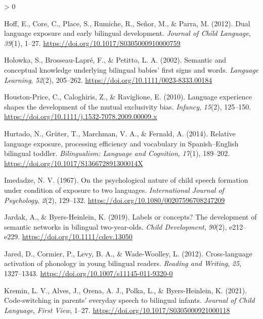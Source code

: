 \documentclass[
  english,
  ,man,floatsintext]{apa6}
\newlength{\cslhangindent}
\newenvironment{CSLReferences}[2] %
 {%
  \setlength{\parindent}{0pt}
  \ifodd #1 \everypar{\setlength{\hangindent}{\cslhangindent}}\ignorespaces\fi
  \ifnum #2 > 0
  \setlength{\parskip}{#2\baselineskip}
  \fi
 }%
 {}
\begin{document}
\begin{CSLReferences}{1}{0}
\leavevmode\hypertarget{ref-Hoff_etal_2012}{}%
Hoff, E., Core, C., Place, S., Rumiche, R., Señor, M., \& Parra, M. (2012). Dual language exposure and early bilingual development. \emph{Journal of Child Language}, \emph{39}(1), 1--27. \url{https://doi.org/10.1017/S0305000910000759}

\leavevmode\hypertarget{ref-Holowka_etal_2002}{}%
Holowka, S., Brosseau-Lapré, F., \& Petitto, L. A. (2002). Semantic and conceptual knowledge underlying bilingual babies' first signs and words. \emph{Language Learning}, \emph{52}(2), 205--262. \url{https://doi.org/10.1111/0023-8333.00184}

\leavevmode\hypertarget{ref-Houston-Price_etal_2010}{}%
Houston-Price, C., Caloghiris, Z., \& Raviglione, E. (2010). Language experience shapes the development of the mutual exclusivity bias. \emph{Infancy}, \emph{15}(2), 125--150. \url{https://doi.org/10.1111/j.1532-7078.2009.00009.x}

\leavevmode\hypertarget{ref-Hurtado_etal_2014}{}%
Hurtado, N., Grüter, T., Marchman, V. A., \& Fernald, A. (2014). Relative language exposure, processing efficiency and vocabulary in {S}panish--{E}nglish bilingual toddler. \emph{Bilingualism: Language and Cognition}, \emph{17}(1), 189--202. \url{https://doi.org/10.1017/S136672891300014X}

\leavevmode\hypertarget{ref-Imedadze_1967}{}%
Imedadze, N. V. (1967). On the psychological nature of child speech formation under condition of exposure to two languages. \emph{International Journal of Psychology}, \emph{2}(2), 129--132. \url{https://doi.org/10.1080/00207596708247209}

\leavevmode\hypertarget{ref-Jardak_Byers-Heinlein_2019}{}%
Jardak, A., \& Byers-Heinlein, K. (2019). Labels or concepts? The development of semantic networks in bilingual two-year-olds. \emph{Child Development}, \emph{90}(2), e212--e229. \url{https://doi.org/10.1111/cdev.13050}

\leavevmode\hypertarget{ref-Jared_etal_2012}{}%
Jared, D., Cormier, P., Levy, B. A., \& Wade-Woolley, L. (2012). Cross-language activation of phonology in young bilingual readers. \emph{Reading and Writing}, \emph{25}, 1327--1343. \url{https://doi.org/10.1007/s11145-011-9320-0}

\leavevmode\hypertarget{ref-Kremin_etal_2021}{}%
Kremin, L. V., Alves, J., Orena, A. J., Polka, L., \& Byers-Heinlein, K. (2021). Code-switching in parents' everyday speech to bilingual infants. \emph{Journal of Child Language}, \emph{First View}, 1--27. \url{https://doi.org/10.1017/S0305000921000118}


\end{CSLReferences}
\end{document}
